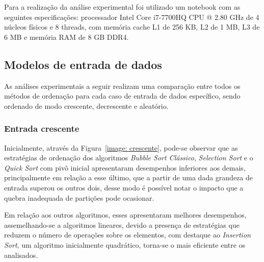 \documentclass[conference,onecolumn]{IEEEtran}
\begin{document}
Para a realização da análise experimental foi utilizado um notebook com as seguintes especificações: processador Intel Core i7-7700HQ CPU @ 2.80 GHz de 4 núcleos físicos e 8 threads, com memória cache L1 de 256 KB, L2 de 1 MB, L3 de 6 MB e memória RAM de 8 GB DDR4.


\subsection{Modelos de entrada de dados}
As análises experimentais a seguir realizam uma comparação entre todos os métodos de ordenação para cada caso de entrada de dados específico, sendo ordenado de modo crescente, decrescente e aleatório.
~\\
\subsubsection{Entrada crescente}

Inicialmente, através da Figura~\ref{image: crescente}, pode-se observar que as estratégias de ordenação dos algoritmos \textit{Bubble Sort Clássico}, \textit{Selection Sort} e o \textit{Quick Sort} com pivô inicial apresentaram desempenhos inferiores aos demais, principalmente em relação a esse último, que a partir de uma dada grandeza de entrada superou os outros dois, desse modo é possível notar o impacto que a quebra inadequada de partições pode ocasionar.

Em relação aos outros algoritmos, esses apresentaram melhores desempenhos, assemelhando-se a algoritmos lineares, devido a presença de estratégias que reduzem o número de operações sobre os elementos, com destaque ao \textit{Insertion Sort}, um algoritmo inicialmente quadrático, torna-se o mais eficiente entre os analisados.
\end{document}
